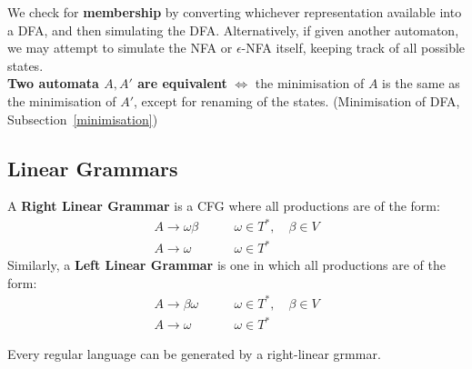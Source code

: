 We check for \textbf{membership} by converting whichever representation available into a
DFA, and then simulating the DFA\@. Alternatively, if given another automaton, we
may attempt to simulate the NFA or $\epsilon$-NFA itself, keeping track of all
possible states.\\

\textbf{Two automata $A, A'$ are equivalent} $\iff$ the minimisation of $A$ is the same
as the minimisation of $A'$, except for renaming of the states. (Minimisation
of DFA, Subsection~\ref{minimisation})

\subsection{Linear Grammars}
\begin{definition}
  A \textbf{Right Linear Grammar} is a CFG where all productions are of the form:
  \begin{align*}
  A\to\omega\beta\qquad &\omega\in T^{*},\quad \beta\in V\\
  A\to \omega\qquad&\omega\in T^{*}
  \end{align*}
  Similarly, a \textbf{Left Linear Grammar} is one in which all productions are of the form:
  \begin{align*}
  A\to\beta\omega\qquad &\omega\in T^{*},\quad \beta\in V\\
  A\to \omega\qquad&\omega\in T^{*}
  \end{align*}
\end{definition}
\begin{theorem}
  Every regular language can be generated by a right-linear grmmar.
\end{theorem}
